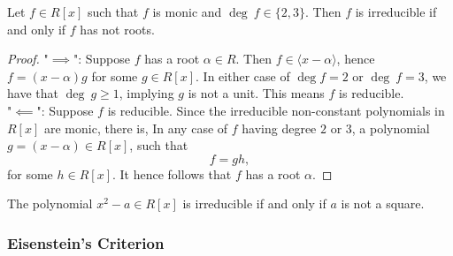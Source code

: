 \begin{proposition}
    Let $f\in R[x]$ such that $f$ is monic and $\deg\ f \in\{2,3\}$. Then $f$ is irreducible if and only if $f$ has not roots. 
\end{proposition}
\begin{proof}
    "$\implies$": Suppose $f$ has a root $\alpha\in R$. Then $f\in \langle x-\alpha\rangle $, hence $f = (x-\alpha)g$ for some $g \in R[x]$. In either case of $\deg f = 2$ or $\deg \ f =3$, we have that $\deg \ g \geq 1$, implying $g$ is not a unit. This means $f$ is reducible.\\
    "$\impliedby$": Suppose $f$ is reducible. Since the irreducible non-constant polynomials in $R[x]$ are monic, there is, In any case of $f$ having degree $2$ or $3$, a polynomial $g = (x-\alpha)\in R[x]$, such that 
    $$f = gh,$$
    for some $h\in R[x]$. It hence follows that $f$ has a root $\alpha$.
\end{proof}
\begin{corollary}
    The polynomial $x^2-a\in R[x]$ is irreducible if and only if $a$ is not a square. 
\end{corollary}
\subsubsection{Eisenstein's Criterion}
